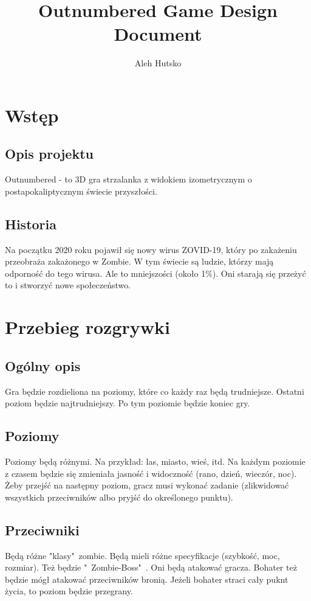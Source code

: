 \documentclass[letterpaper,12pt]{report}
\author{Aleh Hutsko}
\title{Outnumbered Game Design Document}
\date{}
\begin{document}
	\maketitle
	\clearpage
	\tableofcontents
	\clearpage
	\chapter{Wstęp}
	\section{Opis projektu}
	
	Outnumbered - to 3D gra strzalanka z widokiem
	izometrycznym o postapokaliptycznym świecie przyszłości.
	
	\section{Historia}
	
	Na początku 2020 roku pojawił się nowy wirus ZOVID-19,
	który po zakażeniu przeobraża zakażonego w Zombie. W tym
	świecie są ludzie, którzy mają odporność do tego wirusa.
	Ale to mniejszości (około 1\%). Oni starają się przeżyć to
	i stworzyć nowe społeczeństwo.
	
	
	\chapter{Przebieg rozgrywki}
	
	\section{Ogólny opis}
	
	Gra będzie rozdieliona na poziomy, które co każdy raz będą
	trudniejsze. Ostatni poziom będzie najtrudniejszy. Po tym 
	poziomie będzie koniec gry. 
	
	\section{Poziomy}
	
	Poziomy będą różnymi. Na przykład: las, miasto, wieś, itd.
	Na każdym poziomie z czasem będzie się zmieniała jasność i
	widoczność (rano, dzień, wieczór, noc). Żeby przejść na 
	następny poziom, gracz musi wykonać zadanie (zlikwidować wszystkich
	przeciwników albo pryjść do określonego punktu).  
	
	\section{Przeciwniki}
	
	Będą różne "klasy"\ zombie. Będą mieli różne specyfikacje 
	(szybkość, moc, rozmiar). Też będzie "\ Zombie-Boss"\ .
	Oni będą atakować gracza. Bohater też będzie mógł atakować
	przeciwników bronią. Jeżeli bohater straci cały puknt
	życia, to poziom będzie przegrany. 
	
\end{document}
